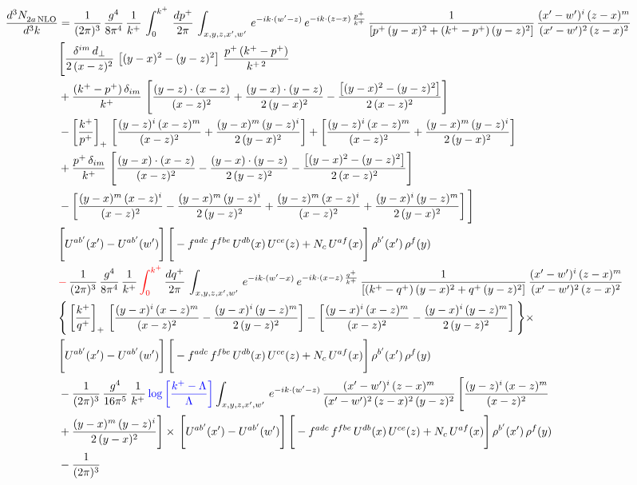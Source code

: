 \documentclass[9pt]{article}
\newcommand{\chg}[1]{{\color{red}#1}}
\numberwithin{equation}{section}
\begin{document}
\begin{align}
    \frac{d^{3}N_{2a\,\rm NLO}^{\rm}}{d^{3}k}  & =  \frac{1}{(2\pi)^{3}}\, \frac{g^{4}}{8\pi^{4}}\,\frac{1}{k^{+}}\,\int_{0}^{k^{+}}\, \frac{dp^{+}}{2\pi}\,\int_{x,y,z,x',w'}\, e^{-ik\cdot(w'-z)}\,e^{-ik\cdot (z-x)\,\frac{p^{+}}{k^{+}}}\,\frac{1}{\left[p^{+}\,(y-x)^{2}+(k^{+}-p^{+})\,(y-z)^{2}\right]}\, \frac{(x'-w')^{i}\,(z-x)^{m}}{(x'-w')^{2}\,(z-x)^{2}} \notag \\ & \Bigg[\frac{\delta^{im}\,d_{\perp}}{2\,(x-z)^{2}}\,\left[(y-x)^{2}-(y-z)^{2}\right]\,\frac{p^{+}\,(k^{+}-p^{+})}{k^{+\,2}}\notag \\ & +\frac{(k^{+}-p^{+})\,\delta_{im}}{k^{+}}\,\left[\frac{(y-z)\cdot (x-z)}{(x-z)^{2}}+\frac{(y-x)\cdot (y-z)}{2\,(y-x)^{2}}-\frac{\left[(y-x)^{2}-(y-z)^{2}\right]}{2\,(x-z)^{2}}\right]\notag \\ & -\left[\frac{k^{+}}{p^{+}}\right]_{+}\,\left[\frac{(y-z)^{i}\,(x-z)^{m}}{(x-z)^{2}}+\frac{(y-x)^{m}\,(y-z)^{i}}{2\,(y-x)^{2}}\right]+ \left[\frac{(y-z)^{i}\,(x-z)^{m}}{(x-z)^{2}}+\frac{(y-x)^{m}\,(y-z)^{i}}{2\,(y-x)^{2}}\right]\notag \\ & +\frac{p^{+}\,\delta_{im}}{k^{+}}\,\left[\frac{(y-x)\cdot (x-z)}{(x-z)^{2}}-\frac{(y-x)\cdot (y-z)}{2\,(y-z)^{2}}-\frac{\left[(y-x)^{2}-(y-z)^{2}\right]}{2\,(x-z)^{2}}\right]\notag \\ &-\left[\frac{(y-x)^{m}\,(x-z)^{i}}{(x-z)^{2}}-\frac{(y-x)^{m}\,(y-z)^{i}}{2\,(y-z)^{2}}+\frac{(y-z)^{m}\,(x-z)^{i}}{(x-z)^{2}}+\frac{(y-x)^{i}\,(y-z)^{m}}{2\,(y-x)^{2}}\right]\Bigg] \notag \\ & \Bigg[U^{ab'}(x')-U^{ab'}(w')\Bigg]\,\Bigg[-f^{adc}\,f^{fbe}\,U^{db}(x)\,U^{ce}(z)+N_{c}\,U^{af}(x)\Bigg]\,\rho^{b'}(x')\,\rho^{f}(y)\notag \\ & \chg{-}\, \frac{1}{(2\pi)^{3}}\,\frac{g^{4}}{8\pi^{4}}\,\frac{1}{k^{+}}\, \chg{\int_{0}^{k^{+}}}\, \frac{dq^{+}}{2\pi} \,  \int_{x,y,z,x',w'}\,e^{-ik\cdot(w'-x)}\,e^{-ik\cdot (x-z)\,\frac{q^{+}}{k^{+}}}\,\frac{1}{\left[(k^{+}-q^{+})\,(y-x)^{2}+q^{+}\,(y-z)^{2}\right]}\, \frac{(x'-w')^{i}\,(z-x)^{m}}{(x'-w')^{2}\,(z-x)^{2}} \notag \\ &\Bigg\{\left[\frac{k^{+}}{q^{+}}\right]_{+}\,\left[\frac{(y-x)^{i}\,(x-z)^{m}}{(x-z)^{2}}-\frac{(y-x)^{i}\,(y-z)^{m}}{2\,(y-z)^{2}}\right] -\left[\frac{(y-x)^{i}\,(x-z)^{m}}{(x-z)^{2}}-\frac{(y-x)^{i}\,(y-z)^{m}}{2\,(y-z)^{2}}\right]\Bigg\}\times\,\notag \\ & \Bigg[U^{ab'}(x')-U^{ab'}(w')\Bigg]\,\Bigg[-f^{adc}\,f^{fbe}\,U^{db}(x)\,U^{ce}(z)+N_{c}\,U^{af}(x)\Bigg]\,\rho^{b'}(x')\,\rho^{f}(y)\notag \\ & - \frac{1}{(2\pi)^{3}}\, \frac{g^{4}}{16\pi^{5}}\,\frac{1}{k^{+}}\,{\color{blue}\log{\left[\frac{k^{+}-\Lambda}{\Lambda}\right]}} \int_{x,y,z,x',w'}\,e^{-ik\cdot(w'-z)}\, \frac{(x'-w')^{i}\,(z-x)^{m}}{(x'-w')^{2}\,(z-x)^{2}\, (y-z)^{2}}\,\Bigg[\frac{(y-z)^{i}\,(x-z)^{m}}{(x-z)^{2}}\notag \\ & +\frac{(y-x)^{m}\,(y-z)^{i}}{2\,(y-x)^{2}}\Bigg]\times\, \Bigg[U^{ab'}(x')-U^{ab'}(w')\Bigg]\,\Bigg[-f^{adc}\,f^{fbe}\,U^{db}(x)\,U^{ce}(z)+N_{c}\,U^{af}(x)\Bigg]\,\rho^{b'}(x')\,\rho^{f}(y)\notag \\ & - \frac{1}{(2\pi)^{3}}\, 
\end{align}
\end{document}
